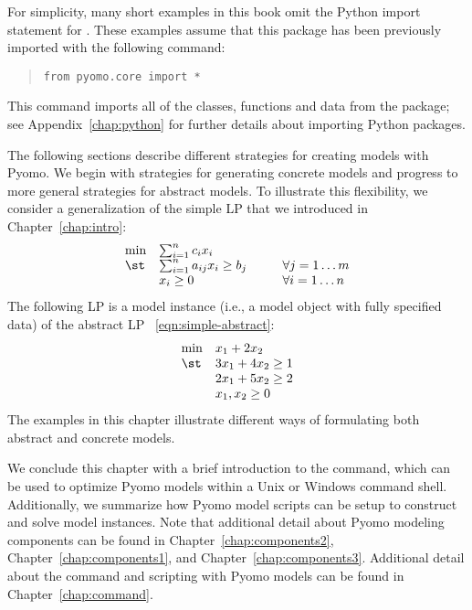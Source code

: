 \begin{Xnotebox}
For simplicity, many short examples in this book omit the Python import statement for .  These examples assume that this package has been previously imported with the following command:
\begin{quote}
\begin{lstlisting}[frame=none]
from pyomo.core import *
\end{lstlisting}
\end{quote}
This command imports all of the classes, functions and data from the  package;  see Appendix~\ref{chap:python} for further details about 
importing Python packages.
\end{Xnotebox}

The following sections describe different strategies for creating
models with Pyomo.  We begin with strategies for generating concrete
models and progress to more general strategies for abstract models.
To illustrate this flexibility, we consider a generalization of the 
simple LP that we introduced in Chapter~\ref{chap:intro}:
\begin{equation}
\label{eqn:simple-abstract}
\begin{array}{lll}
\min & \sum_{i=1}^n c_i x_i &\\
\st & \sum_{i=1}^n a_{ij} x_i \geq b_j \hspace{0.25in} & \forall j = 1 \ldots m\\
    & x_i \geq 0 & \forall i = 1 \ldots n
\end{array}
\end{equation}
The following LP is a model instance (i.e., a model object with fully specified data) of the abstract LP ~\ref{eqn:simple-abstract}:
\begin{equation}
\label{eqn:simple-concrete}
\begin{array}{ll}
\min & x_1 + 2 x_2\\
\st & 3 x_1 + 4 x_2 \geq 1\\
    & 2 x_1 + 5 x_2 \geq 2\\
    & x_1, x_2 \geq 0
\end{array}
\end{equation}
The examples in this chapter illustrate different ways of formulating both
abstract and concrete models.

We conclude this chapter with a brief introduction to the 
command, which can be used to optimize Pyomo models within a Unix or
Windows command shell.  Additionally, we summarize how Pyomo model
scripts can be setup to construct and solve model instances.  Note that
additional detail about Pyomo modeling components can be found in
Chapter~\ref{chap:components2}, Chapter~\ref{chap:components1}, and Chapter~\ref{chap:components3}.  Additional detail
about the  command and scripting with Pyomo models can be
found in Chapter~\ref{chap:command}.


